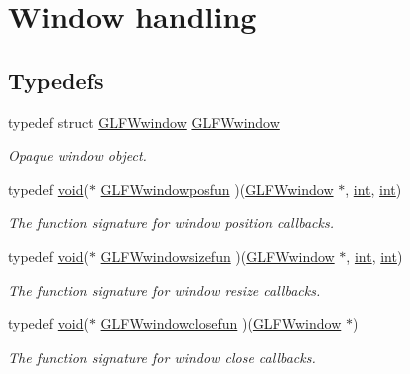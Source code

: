 \hypertarget{group__window}{\section{Window handling}
\label{group__window}
}
\subsection*{Typedefs}
\begin{DoxyCompactItemize}
\item 
typedef struct \hyperlink{group__window_ga3c96d80d363e67d13a41b5d1821f3242}{G\-L\-F\-Wwindow} \hyperlink{group__window_ga3c96d80d363e67d13a41b5d1821f3242}{G\-L\-F\-Wwindow}
\begin{DoxyCompactList}\small\item\em Opaque window object. \end{DoxyCompactList}\item 
typedef \hyperlink{wglew_8h_aeea6e3dfae3acf232096f57d2d57f084}{void}($\ast$ \hyperlink{group__window_ga1c36e52549efd47790eb3f324da71924}{G\-L\-F\-Wwindowposfun} )(\hyperlink{group__window_ga3c96d80d363e67d13a41b5d1821f3242}{G\-L\-F\-Wwindow} $\ast$, \hyperlink{wglew_8h_a500a82aecba06f4550f6849b8099ca21}{int}, \hyperlink{wglew_8h_a500a82aecba06f4550f6849b8099ca21}{int})
\begin{DoxyCompactList}\small\item\em The function signature for window position callbacks. \end{DoxyCompactList}\item 
typedef \hyperlink{wglew_8h_aeea6e3dfae3acf232096f57d2d57f084}{void}($\ast$ \hyperlink{group__window_gaaca1c2715759d03da9834eac19323d4a}{G\-L\-F\-Wwindowsizefun} )(\hyperlink{group__window_ga3c96d80d363e67d13a41b5d1821f3242}{G\-L\-F\-Wwindow} $\ast$, \hyperlink{wglew_8h_a500a82aecba06f4550f6849b8099ca21}{int}, \hyperlink{wglew_8h_a500a82aecba06f4550f6849b8099ca21}{int})
\begin{DoxyCompactList}\small\item\em The function signature for window resize callbacks. \end{DoxyCompactList}\item 
typedef \hyperlink{wglew_8h_aeea6e3dfae3acf232096f57d2d57f084}{void}($\ast$ \hyperlink{group__window_ga07cff8bd3b3d573ecf49bb02d7669c1f}{G\-L\-F\-Wwindowclosefun} )(\hyperlink{group__window_ga3c96d80d363e67d13a41b5d1821f3242}{G\-L\-F\-Wwindow} $\ast$)
\begin{DoxyCompactList}\small\item\em The function signature for window close callbacks. \end{DoxyCompactList}\item 

\end{DoxyCompactItemize}

